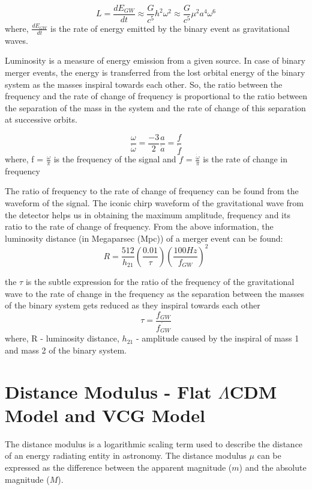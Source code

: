 \begin{equation}\label{luminosity}
L = \frac{dE_{GW}}{dt} \approx \frac{G}{c^{5}}{h^{2}}{\omega^{2}} \approx \frac{G}{c^{5}}{\mu^{2}}{a^{4}}{\omega^{6}}
\end{equation} 
where, $\frac{dE_{GW}}{dt}$ is the rate of energy emitted by the binary event as gravitational waves.

Luminosity is a measure of energy emission from a given source. In case of binary merger events, the energy is transferred from the lost orbital energy of the binary system as the masses inspiral towards each other. So, the ratio between the frequency and the rate of change of frequency is proportional to the ratio between the separation of the mass in the system and the rate of change of this separation at successive orbits.

\begin{equation}\label{ratio frequency and amplitude}
	\frac{\omega}{\dot{\omega}} = \frac{-3}{2}{\frac{a}{\dot{a}}} = \frac{f}{\dot{f}}
\end{equation}
where, f = $\frac{\omega}{\pi}$ is the frequency of the signal and $\dot{f}$ = $\frac{\dot{\omega}}{\pi}$ is the rate of change in frequency

The ratio of frequency to the rate of change of frequency can be found from the waveform of the signal. The iconic chirp waveform of the gravitational wave from the detector helps us in obtaining the maximum amplitude, frequency and its ratio to the rate of change of frequency. From the above information, the luminosity distance (in Megaparsec (Mpc)) of a merger event can be found:
\begin{equation}\label{Luminosity distance}
		R = \frac{512}{h_{21}}{(\frac{0.01}{\tau})}{(\frac{100 Hz}{f_{GW}})}^{2}
\end{equation}

the $\tau$ is the subtle expression for the ratio of the frequency of the gravitational wave to the rate of change in the frequency as the separation between the masses of the binary system gets reduced as they inspiral towards each other  
\begin{equation}\label{tau}
        \tau = \frac{f_{GW}}{\dot{f_{GW}}}
\end{equation}
where, R - luminosity distance, $h_{21}$ - amplitude caused by the inspiral of mass 1 and mass 2 of the binary system.  
\section{Distance Modulus - Flat $\Lambda$CDM Model and VCG Model}
The distance modulus is a logarithmic scaling term used to describe the distance of an energy radiating entity in astronomy. The distance modulus $\mu$ can be expressed as the difference between the apparent magnitude ($m$) and the absolute magnitude ($M$). 

